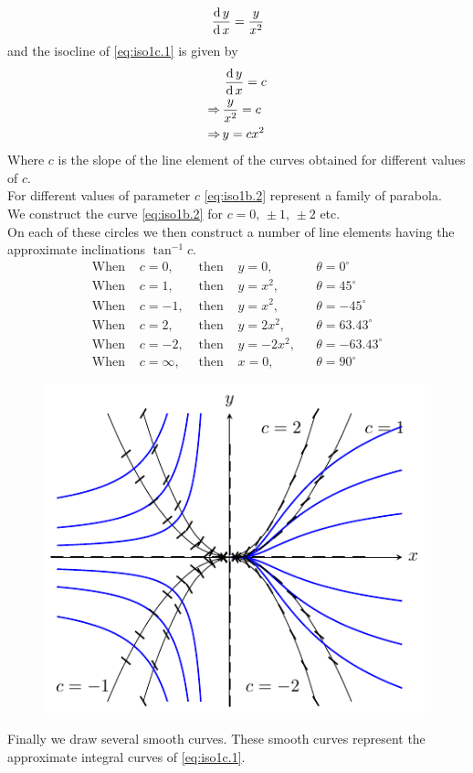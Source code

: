 \documentclass[../main-sheet.tex]{subfiles}
\begin{document}
\begin{soln}[c]
    \begin{equation}
        \,\frac{\mathrm{d}\,y}{\mathrm{d}\,x}=\frac{y}{x^2}\label{eq:iso1c.1}
    \end{equation}
    and the isocline of \eqref{eq:iso1c.1} is given by 
    \begin{align}
        &\,\frac{\mathrm{d}\,y}{\mathrm{d}\,x}=c\notag\\
        \Rightarrow\,&\frac{y}{x^2}=c\notag\\
        \Rightarrow\,&{y}=c{x^2}\label{eq:iso1c.2}
    \end{align}
    Where \(c\) is the slope of the line element of the curves obtained for different values of \(c\).\\
    For different values of parameter \(c\) \eqref{eq:iso1b.2} represent a family of parabola.\\
    We construct the curve \eqref{eq:iso1b.2} for \(c=0,\,\pm 1,\,\pm 2\) etc.\\
    On each of these circles we then construct a number of line elements having the approximate inclinations \(\tan^{-1}c\).
    \begin{align*}
        \text{When } & c=0,  & \text{ then } & y=0,   &&\theta=0^{\circ}\\
        \text{When } & c=1,  & \text{ then } & y=x^2, &&\theta=45^{\circ}\\
        \text{When } & c=-1, & \text{ then } & y=x^2, &&\theta=-45^{\circ}\\
        \text{When } & c=2,  & \text{ then } & y=2x^2, &&\theta=63.43^{\circ}\\
        \text{When } & c=-2, & \text{ then } & y=-2x^2, &&\theta=-63.43^{\circ}\\
        \text{When } & c=\infty, & \text{ then } & x=0, &&\theta=90^{\circ}
    \end{align*}
    \begin{figure}[H]
        \centering
        \includegraphics[scale=2]{pr3.pdf}
    \end{figure}
    Finally we draw several smooth curves. These smooth curves represent the approximate integral curves of \eqref{eq:iso1c.1}.
\end{soln}
\end{document}
